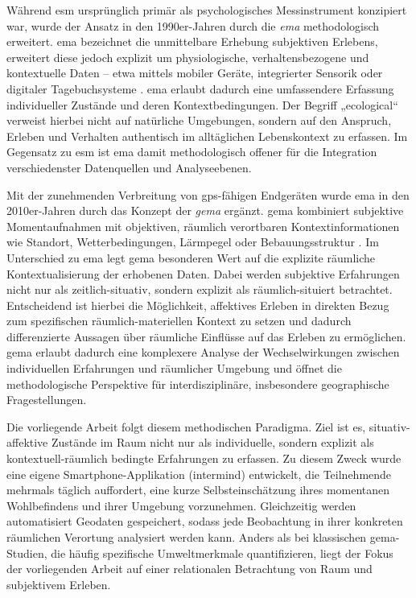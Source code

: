 Während \acrshort{esm} ursprünglich primär als psychologisches Messinstrument konzipiert war, wurde der Ansatz in den 1990er-Jahren durch die \emph{\acrfull{ema}} methodologisch erweitert. \acrshort{ema} bezeichnet die unmittelbare Erhebung subjektiven Erlebens, erweitert diese jedoch explizit um physiologische, verhaltensbezogene und kontextuelle Daten -- etwa mittels mobiler Geräte, integrierter Sensorik oder digitaler Tagebuchsysteme \parencite{shiffmanEcologicalMomentaryAssessment2008}. \acrshort{ema} erlaubt dadurch eine umfassendere Erfassung individueller Zustände und deren Kontextbedingungen. Der Begriff „ecological“ verweist hierbei nicht auf natürliche Umgebungen, sondern auf den Anspruch, Erleben und Verhalten authentisch im alltäglichen Lebenskontext zu erfassen. Im Gegensatz zu \acrshort{esm} ist \acrshort{ema} damit methodologisch offener für die Integration verschiedenster Datenquellen und Analyseebenen.

Mit der zunehmenden Verbreitung von \acrshort{gps}-fähigen Endgeräten wurde \acrshort{ema} in den 2010er-Jahren durch das Konzept der \emph{\acrfull{gema}} ergänzt. \acrshort{gema} kombiniert subjektive Momentaufnahmen mit objektiven, räumlich verortbaren Kontextinformationen wie Standort, Wetterbedingungen, Lärmpegel oder Bebauungsstruktur \parencite{kirchnerSpatiotemporalDeterminantsMental2016}. Im Unterschied zu \acrshort{ema} legt \acrshort{gema} besonderen Wert auf die explizite räumliche Kontextualisierung der erhobenen Daten. Dabei werden subjektive Erfahrungen nicht nur als zeitlich-situativ, sondern explizit als räumlich-situiert betrachtet. Entscheidend ist hierbei die Möglichkeit, affektives Erleben in direkten Bezug zum spezifischen räumlich-materiellen Kontext zu setzen und dadurch differenzierte Aussagen über räumliche Einflüsse auf das Erleben zu ermöglichen. \acrshort{gema} erlaubt dadurch eine komplexere Analyse der Wechselwirkungen zwischen individuellen Erfahrungen und räumlicher Umgebung und öffnet die methodologische Perspektive für interdisziplinäre, insbesondere geographische Fragestellungen.

Die vorliegende Arbeit folgt diesem methodischen Paradigma. Ziel ist es, situativ-affektive Zustände im Raum nicht nur als individuelle, sondern explizit als kontextuell-räumlich bedingte Erfahrungen zu erfassen. Zu diesem Zweck wurde eine eigene Smartphone-Applikation (\gls{intermind}) entwickelt, die Teilnehmende mehrmals täglich auffordert, eine kurze Selbsteinschätzung ihres momentanen Wohlbefindens und ihrer Umgebung vorzunehmen. Gleichzeitig werden automatisiert Geodaten gespeichert, sodass jede Beobachtung in ihrer konkreten räumlichen Verortung analysiert werden kann. Anders als bei klassischen \acrshort{gema}-Studien, die häufig spezifische Umweltmerkmale quantifizieren, liegt der Fokus der vorliegenden Arbeit auf einer relationalen Betrachtung von Raum und subjektivem Erleben.

